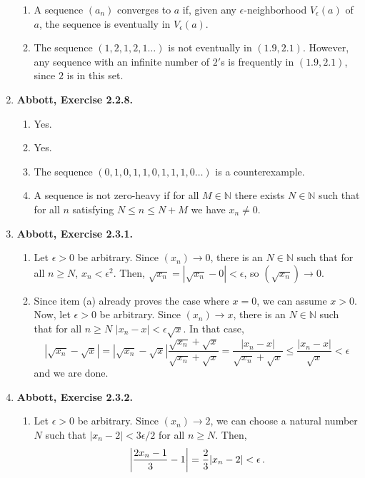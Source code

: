 \documentclass{article}
\DeclarePairedDelimiter\abs{\lvert}{\rvert}
\newcommand{\N}{\mathbb{N}}
\newcommand{\exc}[2][Abbott]{\item \textbf{#1, Exercise #2.}}
\begin{document}
\begin{enumerate}
\begin{enumerate}
		\item A sequence $(a_n)$ converges to $a$ if, given any $\epsilon$-neighborhood $V_\epsilon(a)$ of $a$, the sequence is eventually in $V_\epsilon(a)$.
		      		      		      	      	      	      	                  
		\item The sequence $(1,2,1,2,1\dots)$ is not eventually in $(1.9, 2.1)$. However, any sequence with an infinite number of $2'$s is frequently in $(1.9, 2.1)$, since $2$ is in this set. 
	\end{enumerate}
				      	              
	\exc{2.2.8}
				      	              
	\begin{enumerate}
		\item Yes.
		\item Yes.
		\item The sequence $(0, 1, 0, 1, 1, 0, 1,1,1, 0 \dots)$ is a counterexample.
		\item A sequence is not zero-heavy if for all $M \in \N$ there exists $N \in \N$ such that for all $n$ satisfying $N \leq n \leq N + M$ we have $x_n \neq 0$.
	\end{enumerate}
				      	              
	\exc{2.3.1}
	\begin{enumerate}
		\item  Let $\epsilon > 0$ be arbitrary. Since $(x_n) \rightarrow 0$, there is an $N \in \N$ such that for all $n \geq N$, $x_n < \epsilon^2$. Then, $\sqrt{x_n} = |\sqrt{x_n} - 0| < \epsilon$, so $(\sqrt{x_n}) \rightarrow 0$.
		      		      		      	      	      	      	                  
		\item Since item (a) already proves the case where $x = 0$, we can assume $x > 0$. Now, let $\epsilon > 0$ be arbitrary. Since $(x_n) \rightarrow x$, there is an $N \in \N$ such that for all $n \geq N$ $|x_n-x| < \epsilon \sqrt{x}$. In that case, \begin{equation*}
		      |\sqrt{x_n}-\sqrt{x}| = |\sqrt{x_n}-\sqrt{x}| \frac{\sqrt{x_n}+ \sqrt{x}}{\sqrt{x_n}+ \sqrt{x}} = \frac{|x_n-x|}{\sqrt{x_n}+\sqrt{x}} \leq \frac{|x_n-x|}{\sqrt{x}} < \epsilon
		\end{equation*}
		and we are done.
	\end{enumerate}
				      	              
	\exc{2.3.2}
				      	              
	\begin{enumerate}
		\item Let $\epsilon > 0$ be arbitrary. Since $(x_n) \rightarrow 2$, we can choose a natural number $N$ such that $|x_n-2| < 3\epsilon/2$ for all $n \geq N$. Then, \begin{equation*}
		      \abs*{\frac{2x_n-1}{3}-1} = \frac{2}{3}|x_n-2| < \epsilon \, .
		\end{equation*}
							      		      	            

\end{enumerate}
\end{enumerate}
\end{document}
